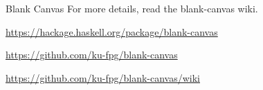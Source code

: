 \begin{hcarentry}{Blank Canvas}
For more details, read the blank-canvas wiki.

\FurtherReading
\begin{compactitem}
\item
  \url{https://hackage.haskell.org/package/blank-canvas}
\item
  \url{https://github.com/ku-fpg/blank-canvas}
\item
  \url{https://github.com/ku-fpg/blank-canvas/wiki}
\end{compactitem}
\end{hcarentry}
